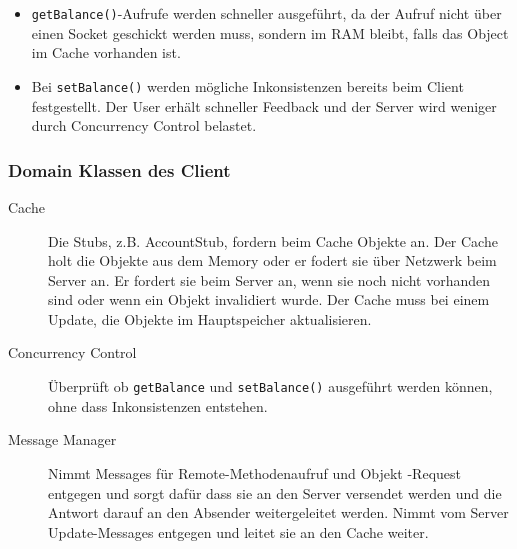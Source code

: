 \begin{itemize}
\item \verb+getBalance()+-Aufrufe werden schneller ausgeführt, da der Aufruf nicht über einen Socket geschickt werden muss, sondern im RAM bleibt, falls das Object im Cache vorhanden ist.
\item Bei \verb+setBalance()+ werden mögliche Inkonsistenzen bereits beim Client festgestellt. Der User erhält schneller Feedback und der Server wird weniger durch Concurrency Control belastet.
\end{itemize}

\subsubsection{Domain Klassen des Client}
\label{sec:domain-klassen}

\begin{description}
\item[Cache] Die Stubs, z.B. AccountStub, fordern beim Cache Objekte an. Der Cache holt die Objekte aus dem Memory oder er fodert sie über Netzwerk beim Server an. Er fordert sie beim Server an, wenn sie noch nicht vorhanden sind oder wenn ein Objekt invalidiert wurde. Der Cache muss bei einem Update, die Objekte im Hauptspeicher aktualisieren.
\item[Concurrency Control] Überprüft ob \verb+getBalance+ und \verb+setBalance()+ ausgeführt werden können, ohne dass Inkonsistenzen entstehen.

\item[Message Manager] Nimmt Messages für Remote-Methodenaufruf und Ob\-jekt\- -Request entgegen und sorgt dafür dass sie an den Server versendet werden und die Antwort darauf an den Absender weitergeleitet werden. Nimmt vom Server Update-Messages entgegen und leitet sie an den Cache weiter.

\end{description}

